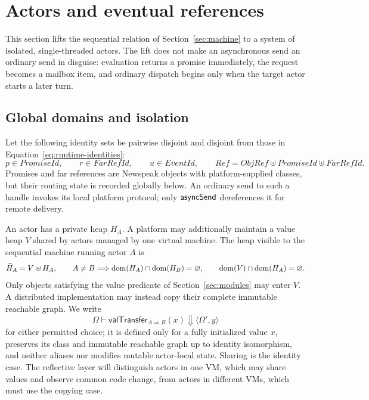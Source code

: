 \section{Actors and eventual references}
\label{sec:actors}

This section lifts the sequential relation of Section~\ref{sec:machine} to a
system of isolated, single-threaded actors.  The lift does not make an
asynchronous send an ordinary send in disguise: evaluation returns a promise
immediately, the request becomes a mailbox item, and ordinary dispatch begins
only when the target actor starts a later turn.

\subsection{Global domains and isolation}

Let the following identity sets be pairwise disjoint and disjoint from those in
Equation~\eqref{eq:runtime-identities}:
\begin{equation}\label{eq:eventual-identities}
 p\in\mathit{PromiseId},\qquad r\in\mathit{FarRefId},\qquad
 u\in\mathit{EventId},\qquad
 \mathit{Ref}=\mathit{ObjRef}\uplus\mathit{PromiseId}\uplus
                 \mathit{FarRefId}.
\end{equation}
Promises and far references are Newspeak objects with platform-supplied
classes, but their routing state is recorded globally below.  An ordinary send
to such a handle invokes its local platform protocol; only
$\mathsf{asyncSend}$ dereferences it for remote delivery.

An actor has a private heap $H_A$.  A platform may additionally maintain a
value heap $V$ shared by actors managed by one virtual machine.  The heap visible to the
sequential machine running actor $A$ is
\begin{equation}\label{eq:actor-heap-view}
 \widehat H_A=V\uplus H_A,\qquad
 A\ne B\Longrightarrow
 \mathop{\mathrm{dom}}(H_A)\cap\mathop{\mathrm{dom}}(H_B)=\varnothing,\qquad
 \mathop{\mathrm{dom}}(V)\cap\mathop{\mathrm{dom}}(H_A)=\varnothing.
\end{equation}
Only objects satisfying the value predicate of Section~\ref{sec:modules} may
enter $V$.  A distributed implementation may instead copy their complete
immutable reachable graph.  We write
\begin{equation}\label{eq:value-transfer-contract}
 \Omega\vdash\mathsf{valTransfer}_{A\Rightarrow B}(x)
   \Downarrow\langle\Omega',y\rangle
\end{equation}
for either permitted choice; it is defined only for a fully initialized value
$x$, preserves its class and immutable reachable graph up to identity
isomorphism, and neither aliases nor modifies mutable actor-local state.
Sharing is the identity case.  The reflective layer will distinguish actors in
one VM, which may share values and observe common code change, from actors in
different VMs, which must use the copying case.

